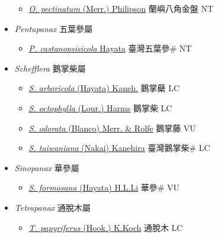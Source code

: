 \begin{itemize}
  \begin{itemize}
        \item[] \href{http://www.theplantlist.org/tpl1.1/search?q=Osmoxylon+pectinatum}{\textit{O. pectinatum} (Merr.) Philipson}   蘭嶼八角金盤 NT
  \end{itemize}
 \item[] \textit{Pentapanax} 五葉參屬
                    
  \begin{itemize}
        \item[] \href{http://www.theplantlist.org/tpl1.1/search?q=Pentapanax+castanopsisicola}{\textit{P. castanopsisicola} Hayata}   臺灣五葉參\# NT
  \end{itemize}
 \item[] \textit{Schefflera} 鵝掌柴屬
                    
  \begin{itemize}
        \item[] \href{http://www.theplantlist.org/tpl1.1/search?q=Schefflera+arboricola}{\textit{S. arboricola} (Hayata) Kaneh.}   鵝掌蘗 LC
        \item[] \href{http://www.theplantlist.org/tpl1.1/search?q=Schefflera+octophylla}{\textit{S. octophylla} (Lour.) Harms}   鵝掌柴 LC
        \item[] \href{http://www.theplantlist.org/tpl1.1/search?q=Schefflera+odorata}{\textit{S. odorata} (Blanco) Merr. \& Rolfe}   鵝掌藤 VU
        \item[] \href{http://www.theplantlist.org/tpl1.1/search?q=Schefflera+taiwaniana}{\textit{S. taiwaniana} (Nakai) Kanehira}   臺灣鵝掌柴\# LC
  \end{itemize}
 \item[] \textit{Sinopanax} 華參屬
                    
  \begin{itemize}
        \item[] \href{http://www.theplantlist.org/tpl1.1/search?q=Sinopanax+formosana}{\textit{S. formosana} (Hayata) H.L.Li}   華參\# VU
  \end{itemize}
 \item[] \textit{Tetrapanax} 通脫木屬
                    
  \begin{itemize}
        \item[] \href{http://www.theplantlist.org/tpl1.1/search?q=Tetrapanax+papyriferus}{\textit{T. papyriferus} (Hook.) K.Koch}   通脫木 LC
  \end{itemize}
  \end{itemize}
